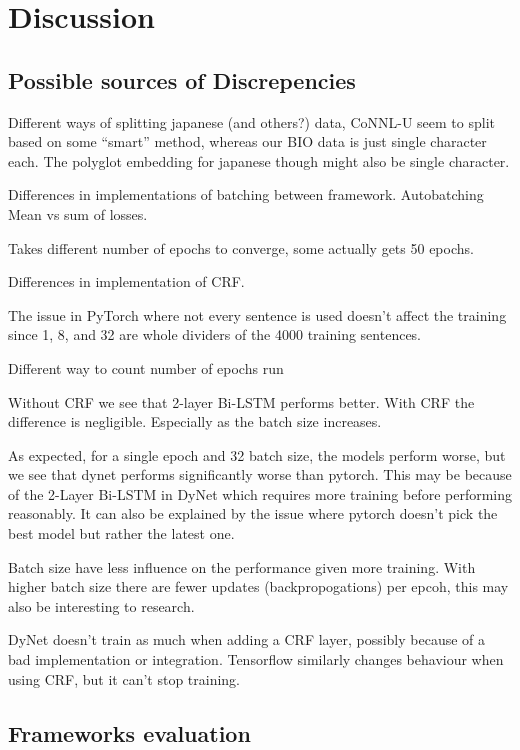 
\section{Discussion}

\subsection{Possible sources of Discrepencies}

Different ways of splitting japanese (and others?) data, CoNNL-U seem to split
based on some ``smart'' method, whereas our BIO data is just single character
each. The polyglot embedding for japanese though might also be single character.

Differences in implementations of batching between framework. Autobatching
Mean vs sum of losses.

Takes different number of epochs to converge, some actually gets 50 epochs.

Differences in implementation of CRF.

The issue in PyTorch where not every sentence is used doesn't affect the
training since 1, 8, and 32 are whole dividers of the 4000 training sentences.

Different way to count number of epochs run

Without CRF we see that 2-layer Bi-LSTM performs better. With CRF the difference is negligible.
Especially as the batch size increases.

As expected, for a single epoch and 32 batch size, the models perform worse, 
but we see that dynet performs significantly worse than pytorch. This may be 
because of the 2-Layer Bi-LSTM in DyNet which requires more training before 
performing reasonably. It can also be explained by the issue where pytorch
doesn't pick the best model but rather the latest one.

Batch size have less influence on the performance given more training.
With higher batch size there are fewer updates (backpropogations) per epcoh,
this may also be interesting to research.

DyNet doesn't train as much when adding a CRF layer, possibly because of a bad
implementation or integration. Tensorflow similarly changes behaviour when using
CRF, but it can't stop training.

\subsection{Frameworks evaluation}
\label{subsec:frameworks}

